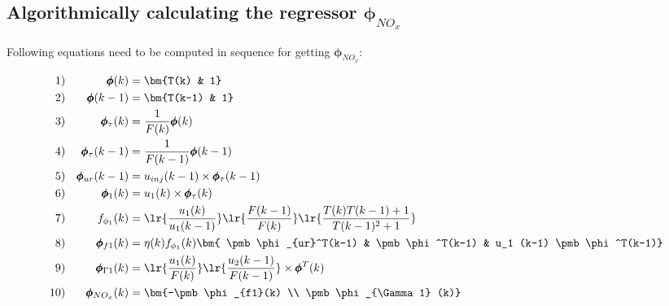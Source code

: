 \subsection{Algorithmically calculating the regressor $\pmb \phi_{NO_x}$}

Following equations need to be computed in sequence for getting $\pmb \phi_{NO_x}$:


\begin{align*}
        1)&& \pmb \phi(k) &= \bm{T(k) & 1}\\
        2)&& \pmb \phi(k-1) &= \bm{T(k-1) & 1} \\
        3)&& \pmb \phi_\tau(k) &= \frac{1}{F(k)} \pmb \phi(k)\\
        4)&& \pmb \phi_\tau(k-1)&= \frac{1}{F(k-1)} \pmb \phi(k-1)\\
        5)&& \pmb \phi_{ur}(k-1)&= u_{inj}(k-1) \times \pmb \phi_\tau (k-1) \\
        6)&& \pmb \phi_1(k) &= u_1(k) \times \pmb \phi_\tau(k)\\
        7)&& f_{\phi_1}(k) &= \lr{\frac{u_1(k)}{u_1(k-1)}}
                                \lr{\frac{F(k-1)}{F(k)}}
                                        \lr{\frac{T(k)T(k-1) + 1}{T(k-1)^2 + 1}}\\
        8)&& \pmb \phi_{f1}(k) &= \eta(k) f_{\phi_1}(k)
                                \bm{ \pmb \phi_{ur}^T(k-1) &
                                    \pmb \phi^T(k-1)  &
                                    u_1 (k-1) \pmb \phi^T(k-1)}   \\
        9)&& \pmb \phi_{\Gamma 1}(k) &= \lr{\frac{u_1(k)}{F(k)}} \lr{\frac{u_2(k-1)}{F(k-1)}} \times \pmb \phi^T(k) \\
        10)&& \pmb \phi_{NO_x}(k) &= \bm{-\pmb \phi_{f1}(k) \\ \pmb \phi_{\Gamma 1} (k)}
\end{align*}
